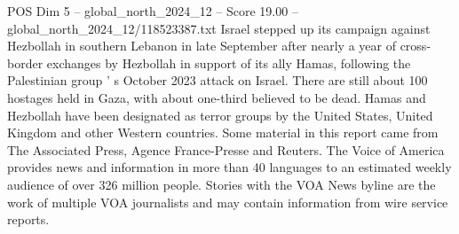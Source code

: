 \begin{textsample}{POS Dim 5 – global\_north\_2024\_12 – Score 19.00 – global\_north\_2024\_12/118523387.txt}
Israel stepped up its campaign against Hezbollah in southern Lebanon in late September after nearly a year of cross-border exchanges by Hezbollah in support of its ally Hamas, following the Palestinian group ' s October 2023 attack on Israel.
There are still about 100 hostages held in Gaza, with about one-third believed to be dead.
Hamas and Hezbollah have been designated as terror groups by the United States, United Kingdom and other Western countries.
Some material in this report came from The Associated Press, Agence France-Presse and Reuters.
The Voice of America provides news and information in more than 40 languages to an estimated weekly audience of over 326 million people.
Stories with the VOA News byline are the work of multiple VOA journalists and may contain information from wire service reports.

\end{textsample}
